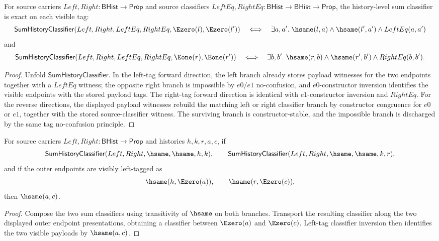 \begin{theorem}
\label{thm:sum-history-classifier-generic-same-tag-exactness}
For source carriers $Left,Right:\mathsf{BHist}\to\mathsf{Prop}$ and source classifiers $LeftEq,RightEq:\mathsf{BHist}\to\mathsf{BHist}\to\mathsf{Prop}$, the history-level sum classifier is exact on each visible tag:
$$
\mathsf{SumHistoryClassifier}(Left,Right,LeftEq,RightEq,\Ezero(l),\Ezero(l'))
\quad\Longleftrightarrow\quad
\exists a,a'.\;\hsame(l,a)\wedge\hsame(l',a')\wedge LeftEq(a,a')
$$
and
$$
\mathsf{SumHistoryClassifier}(Left,Right,LeftEq,RightEq,\Eone(r),\Eone(r'))
\quad\Longleftrightarrow\quad
\exists b,b'.\;\hsame(r,b)\wedge\hsame(r',b')\wedge RightEq(b,b').
$$
\end{theorem}
\begin{proof}
Unfold $\mathsf{SumHistoryClassifier}$. In the left-tag forward direction, the left branch already stores payload witnesses for the two endpoints together with a $LeftEq$ witness; the opposite right branch is impossible by $e0/e1$ no-confusion, and $e0$-constructor inversion identifies the visible endpoints with the stored payload tags. The right-tag forward direction is identical with $e1$-constructor inversion and $RightEq$. For the reverse directions, the displayed payload witnesses rebuild the matching left or right classifier branch by constructor congruence for $e0$ or $e1$, together with the stored source-classifier witness. The surviving branch is constructor-stable, and the impossible branch is discharged by the same tag no-confusion principle.
\end{proof}

\begin{theorem}
\label{thm:sum-history-classifier-left-chain-visible-payload-classification}
For source carriers $Left,Right:\mathsf{BHist}\to\mathsf{Prop}$ and histories
$h,k,r,a,c$, if
$$
\mathsf{SumHistoryClassifier}(Left,Right,\hsame,\hsame,h,k),
\qquad
\mathsf{SumHistoryClassifier}(Left,Right,\hsame,\hsame,k,r),
$$
and if the outer endpoints are visibly left-tagged as
$$
\hsame(h,\Ezero(a)),\qquad \hsame(r,\Ezero(c)),
$$
then $\hsame(a,c)$.
\end{theorem}
\begin{proof}
Compose the two sum classifiers using transitivity of $\hsame$ on both
branches. Transport the resulting classifier along the two displayed outer
endpoint presentations, obtaining a classifier between $\Ezero(a)$ and
$\Ezero(c)$. Left-tag classifier inversion then identifies the two visible
payloads by $\hsame(a,c)$.
\end{proof}

